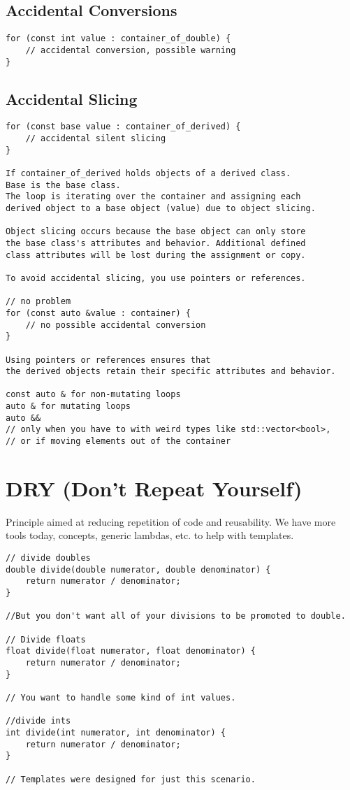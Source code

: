 \documentclass[openany]{report}
\begin{document}
\subsection{Accidental Conversions}

\begin{verbatim}
for (const int value : container_of_double) {
    // accidental conversion, possible warning
}
\end{verbatim}

\subsection{Accidental Slicing}

\begin{verbatim}
for (const base value : container_of_derived) {
    // accidental silent slicing
}

If container_of_derived holds objects of a derived class. 
Base is the base class.
The loop is iterating over the container and assigning each
derived object to a base object (value) due to object slicing.

Object slicing occurs because the base object can only store
the base class's attributes and behavior. Additional defined 
class attributes will be lost during the assignment or copy.

To avoid accidental slicing, you use pointers or references.

// no problem
for (const auto &value : container) {
    // no possible accidental conversion
}

Using pointers or references ensures that 
the derived objects retain their specific attributes and behavior.

const auto & for non-mutating loops
auto & for mutating loops
auto && 
// only when you have to with weird types like std::vector<bool>,
// or if moving elements out of the container
\end{verbatim}

\section{DRY (Don't Repeat Yourself)}

Principle aimed at reducing repetition of code and reusability. 
We have more tools today, concepts, generic lambdas, etc. to help with templates.

\begin{verbatim}
// divide doubles
double divide(double numerator, double denominator) {
    return numerator / denominator;
}

//But you don't want all of your divisions to be promoted to double. 

// Divide floats
float divide(float numerator, float denominator) {
    return numerator / denominator;
}

// You want to handle some kind of int values. 

//divide ints
int divide(int numerator, int denominator) {
    return numerator / denominator;
}

// Templates were designed for just this scenario. 
\end{verbatim}
\end{document}
